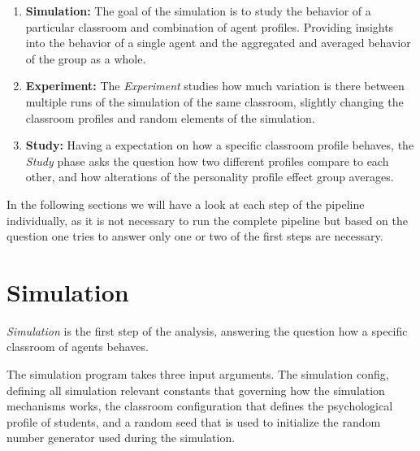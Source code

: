 \begin{enumerate}
    \item \textbf{Simulation:} The goal of the simulation is to study the behavior
    of a particular classroom and combination of agent profiles. Providing insights
    into the behavior of a single agent and the aggregated and averaged behavior of
    the group as a whole.
    \item \textbf{Experiment:} The \textit{Experiment} studies how much variation
    is there between multiple runs of the simulation of the same classroom,
    slightly changing the classroom profiles and random elements of the simulation.
    \item \textbf{Study:} Having a expectation on how a specific classroom profile
    behaves, the \textit{Study} phase asks the question how two different profiles
    compare to each other, and how alterations of the personality profile effect
    group averages.
\end{enumerate}

In the following sections we will have a look at each step of the pipeline individually,
as it is not necessary to run the complete pipeline but based on the question
one tries to answer only one or two of the first steps are necessary.


\section{Simulation}

\begin{figure}[H]
    \hspace*{-4.0\leftmargin}
\end{figure}

\textit{Simulation} is the first step of the analysis, answering the question how
a specific classroom of agents behaves.

The simulation program takes three input arguments. The simulation config,
defining all simulation relevant constants that governing how the simulation mechanisms
works, the classroom configuration that defines the psychological profile of students,
and a random seed that is used to initialize the random number generator used during
the simulation.


